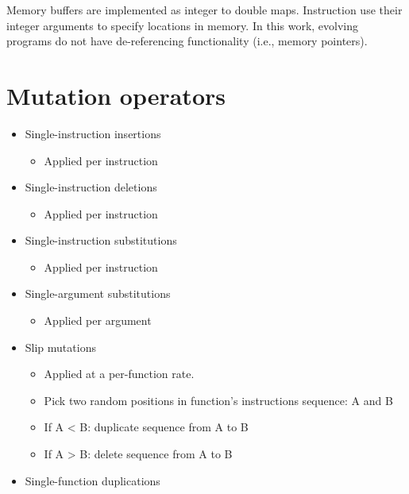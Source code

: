 \documentclass[
]{book}
\providecommand{\tightlist}{%
  \setlength{\itemsep}{0pt}\setlength{\parskip}{0pt}}
\begin{document}
Memory buffers are implemented as integer to double maps. Instruction use their integer arguments to specify locations in memory.
In this work, evolving programs do not have de-referencing functionality (i.e., memory pointers).

\hypertarget{mutation-operators}{%
\section{Mutation operators}\label{mutation-operators}}

\begin{itemize}
\tightlist
\item
  Single-instruction insertions

  \begin{itemize}
  \tightlist
  \item
    Applied per instruction
  \end{itemize}
\item
  Single-instruction deletions

  \begin{itemize}
  \tightlist
  \item
    Applied per instruction
  \end{itemize}
\item
  Single-instruction substitutions

  \begin{itemize}
  \tightlist
  \item
    Applied per instruction
  \end{itemize}
\item
  Single-argument substitutions

  \begin{itemize}
  \tightlist
  \item
    Applied per argument
  \end{itemize}
\item
  Slip mutations \citep{lalejini_gene_2017}

  \begin{itemize}
  \tightlist
  \item
    Applied at a per-function rate.
  \item
    Pick two random positions in function's instructions sequence: A and B
  \item
    If A \textless{} B: duplicate sequence from A to B
  \item
    If A \textgreater{} B: delete sequence from A to B
  \end{itemize}
\item
  Single-function duplications


\end{itemize}
\end{document}
